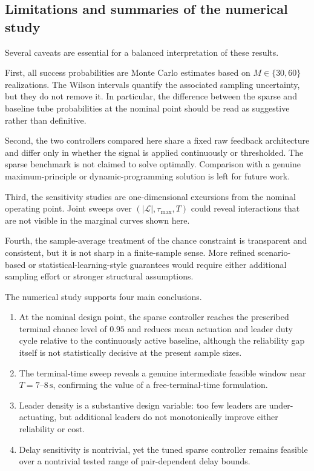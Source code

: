 \documentclass[pdflatex,sn-mathphys-num]{sn-jnl}%
\numberwithin{equation}{section}
\theoremstyle{thmstyleone}%
\theoremstyle{remark}
\theoremstyle{definition}
\newcommand{\calL}{\mathcal{L}}
\begin{document}
\subsection{Limitations and summaries of the numerical study}
\label{subsec:num-limits}

Several caveats are essential for a balanced interpretation of these
results.

First, all success probabilities are Monte Carlo estimates based on
$M\in\{30,60\}$ realizations. The Wilson intervals quantify the associated
sampling uncertainty, but they do not remove it. In particular, the
difference between the sparse and baseline tube probabilities at the
nominal point should be read as suggestive rather than definitive.

Second, the two controllers compared here share a fixed raw feedback
architecture and differ only in whether the signal is applied continuously
or thresholded. The sparse benchmark is not claimed to solve
 optimally. Comparison with a genuine maximum-principle or
dynamic-programming solution is left for future work.

Third, the sensitivity studies are one-dimensional excursions from the
nominal operating point. Joint sweeps over $(|\calL|,\tau_{\max},T)$ could
reveal interactions that are not visible in the marginal curves shown here.

Fourth, the sample-average treatment of the chance constraint
\cite{nemirovski2007convex} is transparent and consistent,
but it is not sharp in a finite-sample sense. More refined scenario-based
or statistical-learning-style guarantees would require either additional
sampling effort or stronger structural assumptions.

The numerical study supports four main conclusions.
\begin{enumerate}[label=(\roman*),nosep]
\item At the nominal design point, the sparse controller reaches the
prescribed terminal chance level of $0.95$ and reduces mean actuation and
leader duty cycle relative to the continuously active baseline, although the
reliability gap itself is not statistically decisive at the present sample
sizes.
\item The terminal-time sweep reveals a genuine intermediate feasible window
near $T=7$--$8\,\mathrm{s}$, confirming the value of a free-terminal-time
formulation.
\item Leader density is a substantive design variable: too few leaders are
under-actuating, but additional leaders do not monotonically improve either
reliability or cost.
\item Delay sensitivity is nontrivial, yet the tuned sparse controller
remains feasible over a nontrivial tested range of pair-dependent delay
bounds.
\end{enumerate}
\end{document}
